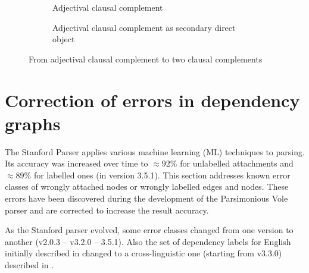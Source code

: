     \begin{figure}[!ht]
    	\begin{subfigure}{0.45\linewidth}
    		\centering
    		\caption{Adjectival clausal complement}
    		\label{fig:xcomp-jj-init}
    	\end{subfigure}
    	\quad
    	\begin{subfigure}{0.45\linewidth}
    		\centering
    		\caption{Adjectival clausal complement as secondary direct object}
    		\label{fig:xcomp-jj-final}
    	\end{subfigure}
    	\caption{From adjectival clausal complement to two clausal complements}
		\label{fig:xcomp-jj-final}
    \end{figure}

\section{Correction of errors in dependency graphs}
\label{sec:preprocessing2}

    The Stanford Parser applies various machine learning (ML) techniques to parsing. Its accuracy was increased over time to $\approx92\%$ for unlabelled attachments and $\approx89\%$ for labelled ones (in version 3.5.1). This section addresses known error classes of wrongly attached nodes or wrongly labelled edges and nodes. These errors have been discovered during the development of the Parsimonious Vole parser and are corrected to increase the result accuracy. 

    As the Stanford parser evolved, some error classes changed from one version to another (v2.0.3 -- v3.2.0 -- 3.5.1). Also the set of dependency labels for English initially described in \citet{Marneffe2008, Marneffe2008a} changed to a cross-linguistic one (starting from v3.3.0) described in \citet{Marneffe2014}.

